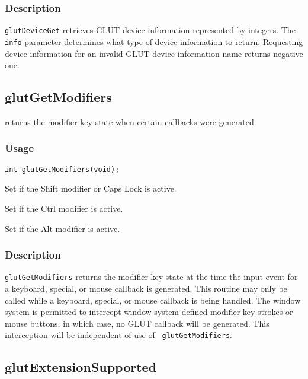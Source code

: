 \subsubsection*{Description}

{\tt glutDeviceGet} retrieves GLUT device information represented by integers.
The {\tt info} parameter determines what type of device information to return.
Requesting device information for an invalid GLUT device information name
returns negative one.

\subsection{glutGetModifiers}

 returns the modifier key state when certain callbacks
were generated.

\subsubsection*{Usage}
\begin{verbatim}
int glutGetModifiers(void);
\end{verbatim}

\begin{description}
\itemsep 0in
\item[{\tt GLUT\_ACTIVE\_SHIFT}]  Set if the Shift modifier or Caps Lock is active.
\item[{\tt GLUT\_ACTIVE\_CTRL}]  Set if the Ctrl modifier is active.
\item[{\tt GLUT\_ACTIVE\_ALT}]  Set if the Alt modifier is active.
\end{description}

\subsubsection*{Description}

{\tt glutGetModifiers} returns the modifier key state at the time the input event
for a keyboard,
special, or mouse callback is generated.  This routine may only be
called while a keyboard, special, or mouse callback is being handled.
The window system is permitted to intercept window system defined modifier key
strokes or mouse buttons, in which case, no GLUT callback will be
generated.  This interception will be independent of use of {\tt
glutGetModifiers}.

\subsection{glutExtensionSupported}

